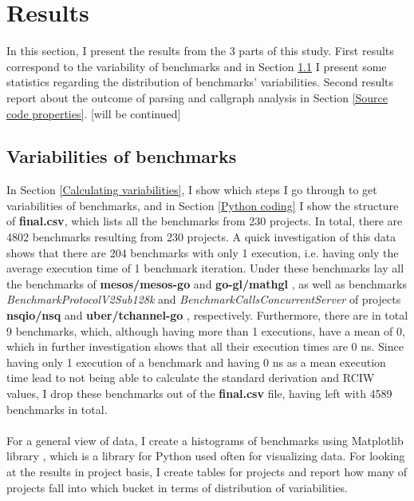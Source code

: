 \documentclass{seal_thesis}
\begin{document}
\chapter{Results}
\label{Results}
In this section, I present the results from the 3 parts of this study. First results correspond to the variability of benchmarks and in Section \ref{Variabilities of benchmarks} I present some statistics regarding the distribution of benchmarks' variabilities. Second results report about the outcome of parsing and callgraph analysis in Section \ref{Source code properties}. [will be continued]

\section{Variabilities of benchmarks}
\label{Variabilities of benchmarks}

In Section \ref{Calculating variabilities}, I show which steps I go through to get variabilities of benchmarks, and in Section \ref{Python coding} I show the structure of \textbf{final.csv}, which lists all the benchmarks from 230 projects. In total, there are 4802 benchmarks resulting from 230 projects. A quick investigation of this data shows that there are 204 benchmarks with only 1 execution, i.e. having only the average execution time of 1 benchmark iteration. Under these benchmarks lay all the benchmarks of \textbf{mesos/mesos-go} \cite{mesos/mesos-go} and \textbf{go-gl/mathgl} \cite{go-gl/mathgl}, as well as benchmarks \textit{BenchmarkProtocolV2Sub128k} and \textit{BenchmarkCallsConcurrentServer} of projects \textbf{nsqio/nsq} \cite{nsqio/nsq} and \textbf{uber/tchannel-go} \cite{uber/tchannel-go}, respectively. Furthermore, there are in total 9 benchmarks, which, although having more than 1 executions, have a mean of 0, which in further investigation shows that all their execution times are 0 ns. Since having only 1 execution of a benchmark and having 0 ns as a mean execution time lead to not being able to calculate the standard derivation and RCIW values, I drop these benchmarks out of the \textbf{final.csv} file, having left with 4589 benchmarks in total.\\
\\
For a general view of data, I create a histograms of benchmarks using Matplotlib library \cite{Matplotlib}, which is a library for Python used often for visualizing data. For looking at the results in project basis, I create tables for projects and report how many of projects fall into which bucket in terms of distribution of variabilities.
\end{document}
